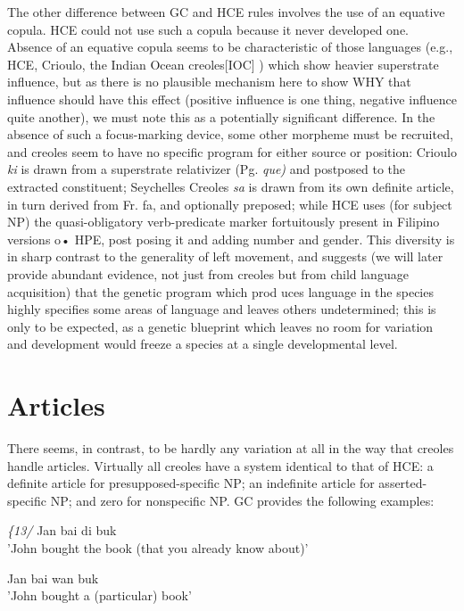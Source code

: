 The other difference between GC and HCE rules involves the use of an equative copula. HCE could not use such a copula because it never developed one. Absence of an equative copula seems to be
characteristic of those languages (e.g., HCE, Crioulo, the Indian Ocean creoles[IOC] ) which show heavier superstrate influence, but as there is no plausible mechanism here to show WHY that influence should have this effect (positive influence is one thing, negative influence quite
another), we must note this as a potentially significant difference. In the absence of such a focus-marking device, some other morpheme must be recruited, and creoles seem to have no specific program for either source or position: Crioulo \textit{ki} is drawn from a superstrate rela\-tivizer (Pg. \textit{que}\textit{)} and postposed to the extracted constituent; Seychelles Creoles \textit{sa} is drawn from its own definite article, in turn derived from Fr. fa, and optionally preposed; while HCE uses (for subject NP) the quasi-obligatory verb-predicate marker fortuitously present in Filipino versions o• HPE, post posing it and adding number and gender. This diversity is in sharp contrast to the generality of left movement, and suggests (we will later provide abundant evidence, not just from creoles but from child language acquisition) that the genetic program which prod uces language in the species highly specifies some areas of language and leaves others undetermined; this is only to be expected, as a genetic blueprint which leaves no room for variation and development would freeze a species at a single developmental level.

\section{Articles}

There seems, in contrast, to be hardly any variation at all in the way that creoles handle articles. Virtually all creoles have a system identical to that of HCE: a definite article for presupposed-specific NP; an indefinite article for asserted-specific NP; and zero for nonspecific NP. GC provides the following examples:


\ea\label{ex:13}
\textit{\{13}\textit{/} Jan bai di buk\\
\glt 'John bought the book (that you already know about)'
\z

\ea\label{ex:14}
 Jan bai wan buk\\
\glt 'John bought a (particular) book'
\z


